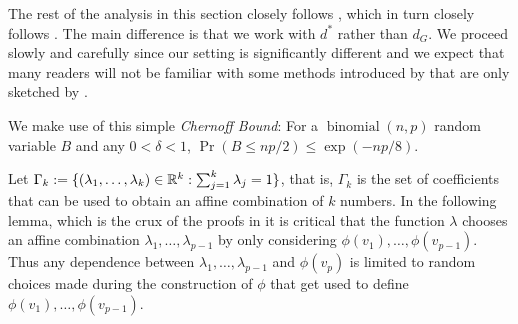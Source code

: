 \documentclass{patmorin}
\renewcommand{\le}{\leqslant}
\newcommand{\defin}[1]{\emph{\textcolor{brightmaroon}{#1}}}
\begin{document}


The rest of the analysis in this section closely follows \citet{rao:small}, which in turn closely follows \citet{feige:approximating}.  The main difference is that we work with $d^*$ rather than $d_G$.  We proceed slowly and carefully since our setting is significantly different and we expect that many readers will not be familiar with some methods introduced by \citet{feige:approximating} that are only sketched by \citet{rao:small}.

We make use of this simple \defin{Chernoff Bound}:  For a $\operatorname{binomial}(n,p)$ random variable $B$ and any $0<\delta<1$, $\Pr(B \le np/2) \le \exp(-np/8)$.

Let $\Gamma_k:=\{(\lambda_1,\ldots,\lambda_k)\in \mathbb{R}^k:\sum_{j=1}^k\lambda_j=1\}$, that is, $\Gamma_k$ is the set of coefficients that can be used to obtain an affine combination of $k$ numbers.  In the following lemma, which is the crux of the proofs in \cite{rao:small,feige:approximating} it is critical that the function $\lambda$ chooses an affine combination $\lambda_1,\ldots,\lambda_{p-1}$ by only considering $\phi(v_1),\ldots,\phi(v_{p-1})$.  Thus any dependence between $\lambda_1,\ldots,\lambda_{p-1}$ and $\phi(v_p)$ is limited to random choices made during the construction of $\phi$ that get used to define $\phi(v_1),\ldots,\phi(v_{p-1})$.
\end{document}
